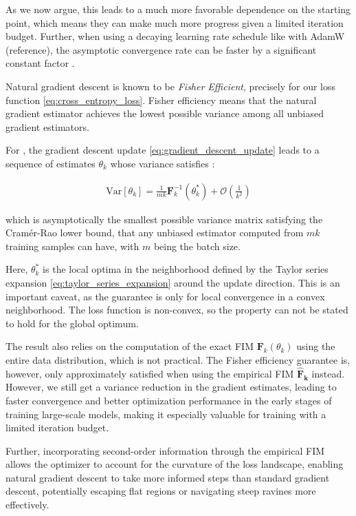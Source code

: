 As we now argue, this leads to a much more favorable dependence on the starting point, which means they can make much more progress given a limited iteration budget. Further, when using a decaying learning rate schedule like with AdamW (reference), the asymptotic convergence rate can be faster by a significant constant factor \citep{martens2020new}.

Natural gradient descent is known \citep{martens2020new} to be \textit{Fisher Efficient}, precisely for our loss function \ref{eq:cross_entropy_loss}. Fisher efficiency means that the natural gradient estimator achieves the lowest possible variance among all unbiased gradient estimators.

For \lowrank, the gradient descent update \ref{eq:gradient_descent_update} leads to a sequence of estimates \( \theta_{k} \) whose variance satisfies \citep{amariNaturalGradientWorks1998}:

\begin{eqnarray}
\text{Var}[\theta_{k}] = \frac{1}{mk} \mathbf{F}_{k}^{-1}(\theta_{k}^*) + \mathcal{O}\left(\frac{1}{k^2}\right)
\label{eq:variance_reduction}
\end{eqnarray}

which is asymptotically the smallest possible variance matrix satisfying the Cramér-Rao lower bound, that any unbiased estimator computed from \(mk\) training samples can have, with \(m\) being the batch size.

Here, \(\theta_{k}^*\) is the local optima in the neighborhood defined by the Taylor series expansion \ref{eq:taylor_series_expansion} around the update direction. This is an important caveat, as the guarantee is only for local convergence in a convex neighborhood. The loss function is non-convex, so the property can not be stated to hold for the global optimum.

The result also relies on the computation of the exact FIM \( \mathbf{F}_{k}(\theta_{k}) \) using the entire data distribution, which is not practical. The Fisher efficiency guarantee is, however, only approximately satisfied when using the empirical FIM \(\mathbf{\hat{F}_{k}}\) instead. However, we still get a variance reduction in the gradient estimates, leading to faster convergence and better optimization performance in the early stages of training large-scale models, making it especially valuable for training with a limited iteration budget.

Further, incorporating second-order information through the empirical FIM allows the optimizer to account for the curvature of the loss landscape, enabling natural gradient descent to take more informed steps than standard gradient descent, potentially escaping flat regions or navigating steep ravines more effectively.

